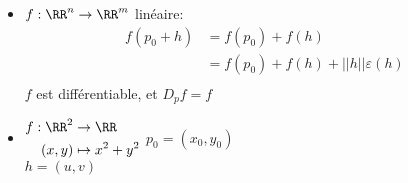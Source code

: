 \documentclass[../main.tex]{subfile}
\begin{document}
\begin{ex}
\begin{itemize}	
	\item $f : \RR^n \to \RR^m$ linéaire:
	$$
\begin{aligned}
	f(p_0 + h) &= f(p_0) + f(h)\\
	&= f(p_0) + f(h) + ||h||\varepsilon(h)\\
\end{aligned}
	$$
	$f$ est différentiable, et $D_pf = f$

	\item $
\begin{aligned}
	f : \RR^2 &\to \RR\\
	(x, y) &\mapsto x^2 + y^2
\end{aligned}$
	$p_0 =(x_0, y_0)$\\
	$h =(u,v)$\\

\end{itemize}
\end{ex}
\end{document}
